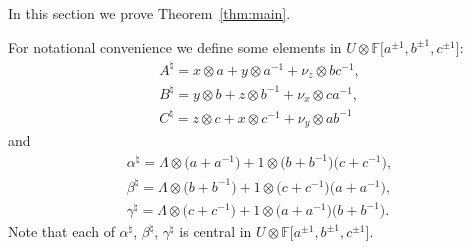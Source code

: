 \documentclass[11pt]{article}
\numberwithin{equation}{section}
\begin{document}
In this section we prove Theorem~\ref{thm:main}.

For notational convenience we def\/ine some elements in
$U \otimes
\mathbb F \lbrack a^{\pm 1}, b^{\pm 1}, c^{\pm 1}\rbrack$:
\begin{gather}
A^\natural  =  x \otimes a + y \otimes a^{-1} + \nu_z \otimes bc^{-1},
\label{eq:aform}
\\
B^\natural  =  y \otimes b + z \otimes b^{-1} + \nu_x \otimes ca^{-1},
\label{eq:bform}
\\
C^\natural  =  z \otimes c + x \otimes c^{-1} + \nu_y \otimes ab^{-1}
\label{eq:cform}
\end{gather}
and
\begin{gather}
\alpha^\natural
 =
\Lambda \otimes \big(a+a^{-1}\big) + 1 \otimes \big(b+b^{-1}\big)\big(c+c^{-1}\big),
\label{eq:amaincom1}
\\
\beta^\natural  =
\Lambda \otimes \big(b+b^{-1}\big) + 1 \otimes \big(c+c^{-1}\big)(a+a^{-1}\big),
\label{eq:bmaincom2}
\\
\gamma^\natural
 =
\Lambda \otimes \big(c+c^{-1}\big) + 1 \otimes \big(a+a^{-1}\big)\big(b+b^{-1}\big).
\label{eq:cmaincom3}
\end{gather}
Note that each of $\alpha^\natural$, $\beta^\natural$, $\gamma^\natural$ is
central in
$U \otimes
\mathbb F \lbrack a^{\pm 1}, b^{\pm 1}, c^{\pm 1}\rbrack$.
\end{document}
